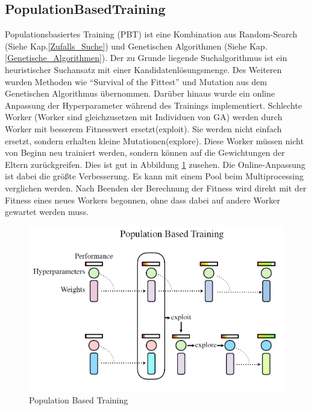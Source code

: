 \subsection{PopulationBasedTraining}
Populationsbasiertes Training (PBT) ist eine Kombination aus Random-Search (Siehe Kap.\ref{Zufalls_Suche}) und Genetischen Algorithmen (Siehe Kap.\ref{Genetische_Algorithmen}). Der zu Grunde liegende Suchalgorithmus ist ein heuristischer Suchansatz mit einer Kandidatenlösungsmenge. Des Weiteren wurden Methoden wie "`Survival of the Fittest"' und Mutation aus dem Genetischen Algorithmus übernommen. Darüber hinaus wurde ein online Anpassung der Hyperparameter während des Trainings implementiert. Schlechte Worker (Worker sind gleichzusetzen mit Individuen von GA) werden durch Worker mit besserem Fitnesswert ersetzt(exploit). Sie werden nicht einfach ersetzt, sondern erhalten kleine Mutationen(explore). Diese Worker müssen nicht von Beginn neu trainiert werden, sondern können auf die Gewichtungen der Eltern zurückgreifen. Dies ist gut in Abbildung \ref{fig:pbt} zusehen. Die Online-Anpassung ist dabei die größte Verbesserung. Es kann mit einem Pool beim Multiprocessing verglichen werden. Nach Beenden der Berechnung der Fitness wird direkt mit der Fitness eines neues Workers begonnen, ohne dass dabei auf andere Worker gewartet werden muss\cite{pbt}. 

\noindent%
\begin{figure}[h]
  \centering  
  \includegraphics[scale=0.3]{img/pbt.png}
  \caption{Population Based Training \cite{pbt}}
  \label{fig:pbt}
\end{figure}

